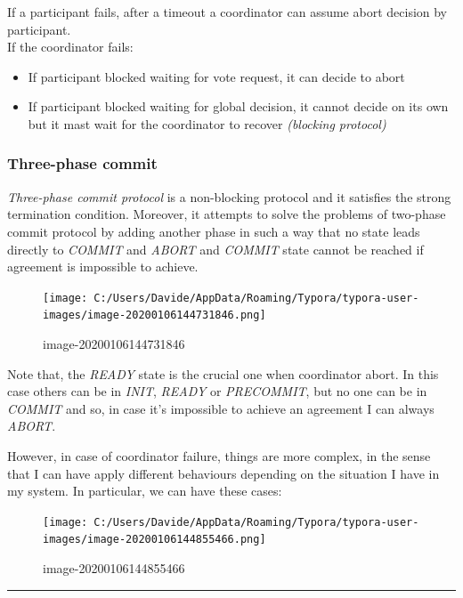 If a participant fails, after a timeout a coordinator can assume abort decision by participant.\\
If the coordinator fails:
\begin{itemize}
\itemsep1pt\parskip0pt
\item
  If participant blocked waiting for vote request, it can decide to
  abort
\item
  If participant blocked waiting for global decision, it cannot decide
  on its own but it mast wait for the coordinator to recover \textit{(blocking
  protocol)}
\end{itemize}

\subsubsection{Three-phase commit}\label{three-phase-commit}
\textit{Three-phase commit protocol} is a non-blocking protocol and it satisfies the strong termination condition. Moreover, it attempts to solve the problems of two-phase commit protocol by adding another phase in such a way that no state leads directly to \textit{COMMIT} and \textit{ABORT} and \textit{COMMIT} state cannot be reached if agreement is impossible to achieve.

\begin{figure}[htbp]
\centering
\texttt{[image: C:/Users/Davide/AppData/Roaming/Typora/typora-user-images/image-20200106144731846.png]}
\caption{image-20200106144731846}
\end{figure}

Note that, the \textit{READY} state is the crucial one when coordinator abort. In this case others can be in \textit{INIT}, \textit{READY} or \textit{PRECOMMIT}, but no one can be in \textit{COMMIT} and so, in case it's impossible to achieve an agreement I can always \textit{ABORT}.

However, in case of coordinator failure, things are more complex, in the sense that I can have apply different behaviours depending on the situation I have in my system. In particular, we can have these cases:

\begin{figure}[htbp]
\centering
\texttt{[image: C:/Users/Davide/AppData/Roaming/Typora/typora-user-images/image-20200106144855466.png]}
\caption{image-20200106144855466}
\end{figure}

\begin{center}\rule{3in}{0.4pt}\end{center}

